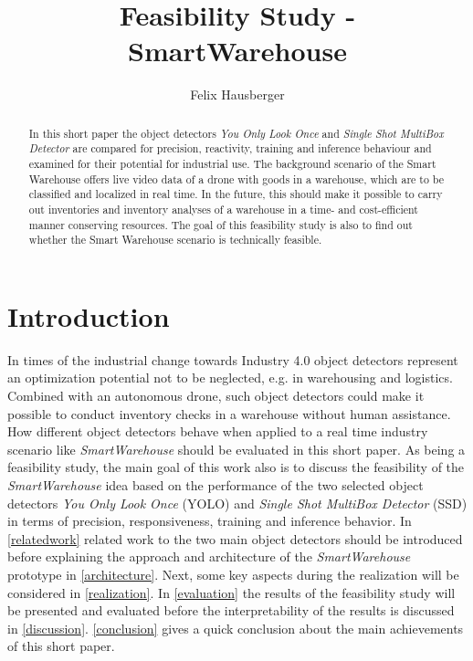 \documentclass[a4paper, 10pt, journal]{wissarbIEEE}      %
\title{\LARGE \bf Feasibility Study - SmartWarehouse}
\author{Felix Hausberger}
\begin{document}
	

\maketitle

\begin{abstract}

In this short paper the object detectors \textit{You Only Look Once} and \textit{Single Shot MultiBox Detector} are compared for precision, reactivity, training and inference behaviour and examined for their potential for industrial use. The background scenario of the Smart Warehouse offers live video data of a drone with goods in a warehouse, which are to be classified and localized in real time. In the future, this should make it possible to carry out inventories and inventory analyses of a warehouse in a time- and cost-efficient manner conserving resources. The goal of this feasibility study is also to find out whether the Smart Warehouse scenario is technically feasible.

\end{abstract}

\section{Introduction}

In times of the industrial change towards Industry 4.0 object detectors represent an optimization potential not to be neglected, e.g. in warehousing and logistics. Combined with an autonomous drone, such object detectors could make it possible to conduct inventory checks in a warehouse without human assistance. How different object detectors behave when applied to a real time industry scenario like \textit{SmartWarehouse} should be evaluated in this short paper. As being a feasibility study, the main goal of this work also is to discuss the feasibility of the \textit{SmartWarehouse} idea based on the performance of the two selected object detectors \textit{You Only Look Once} (YOLO) and \textit{Single Shot MultiBox Detector} (SSD) in terms of precision, responsiveness, training and inference behavior. In \autoref{relatedwork} related work to the two main object detectors should be introduced before explaining the approach and architecture of the \textit{SmartWarehouse} prototype in \autoref{architecture}. Next, some key aspects during the realization will be considered in \autoref{realization}. In \autoref{evaluation} the results of the feasibility study will be presented and evaluated before the interpretability of the results is discussed in \autoref{discussion}. \autoref{conclusion} gives a quick conclusion about the main achievements of this short paper.
\end{document}
